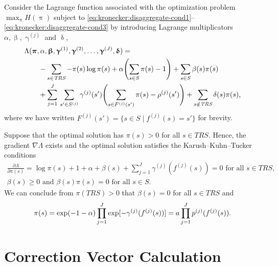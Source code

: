 \documentclass[a4paper,11pt,twoside,openright]{memoir}
\makeatletter
\renewcommand*{\vec}[1]{\boldsymbol{\mathrm{#1}}}
\newcommand*{\TRS}{\textit{TRS}}
\newcounter{proof}
\newcommand{\proofname}{Proof}
\newenvironment{proof}[1][\proofname]{%
  \th@nonumberplain
  \def\theorem@headerfont{\itshape}%
  \normalfont
  \theoremsymbol{\ensuremath{_\blacksquare}}%
  \@thm{proof}{proof}{#1}%
}{\@endtheorem}
\theoremstyle{my}
\makeatother
\begin{document}
\begin{proof}
  Consider the Lagrange function associated with the optimization
  problem $\max_{\vec{\uppi}} H(\vec{\uppi})$ subject to
  \eqref{eq:kronecker:disaggregate-cond1}--%
  \eqref{eq:kronecker:disaggregate-cond3} by introducing Lagrange
  multiplicators $\alpha, \vec{\upbeta}, \vec{\upgamma}^{(j)}$ and
  $\vec{\updelta}$,
  \begin{equation}
    \begin{aligned}
      & \Lambda(\vec{\pi}, \alpha, \vec{\upbeta},
      \vec{\upgamma}^{(1)}, \vec{\upgamma}^{(2)}, \ldots,
      \vec{\upgamma}^{(J)},
      \vec{\updelta}) =\\
      &\qquad - \sum_{s \in \TRS} - \pi(s) \log \pi(s) + \alpha
      \Biggl( \sum_{s \in S} \pi(s) - 1 \Biggr) + \sum_{s \in S}
      \beta(s) \pi(s) \\
      &\qquad + \sum_{j = 1}^{J} \, \sum_{s' \in S^{(j)}}
      \gamma^{(j)}(s') \Biggl( \sum_{s \in F^{(j)}(s')} \pi(s) -
      \rho^{(j)}(s') \Biggr) + \sum_{s \notin \TRS} \delta(s) \pi(s)
      \text,
    \end{aligned}
  \end{equation}
  where we have written $F^{(j)}(s') = \{ s \in S \mid f^{(j)}(s) = s'
  \}$ for brevity.

  Suppose that the optimal solution has $\pi(s) > 0$ for all
  $s \in \TRS$. Hence, the gradient $\nabla \Lambda$ exists and the
  optimal solution satisfies the Karush--Kuhn--Tucker conditions
  \begin{gather}
    \frac{\partial \Lambda}{\partial \pi(s)}
    = \log \pi(s) + 1 + \alpha + \beta(s) + \sum_{j = 1}^{J}
    \gamma^{(j)}(f^{(j)}(s)) = 0 \text{ for all $s \in \TRS$,} \\
    \beta(s) \ge 0 \text{ and } \beta(s) \pi(s) = 0 \text{ for all $s
      \in S$.}
  \end{gather}
  We can conclude from $\pi(\TRS) > 0$ that $\beta(s) = 0$ for all
  $s \in \TRS$ and
  \begin{equation}
    \pi(s) = \exp (-1 - \alpha) \prod_{j = 1}^J \exp
    [ -\gamma^{(j)}(f^{(j)}(s)) ]
    = a \prod_{j = 1}^J p^{(j)}(f^{(j)}(s)) \text.
  \end{equation}
\end{proof}

\section{Correction Vector Calculation}
\end{document}
